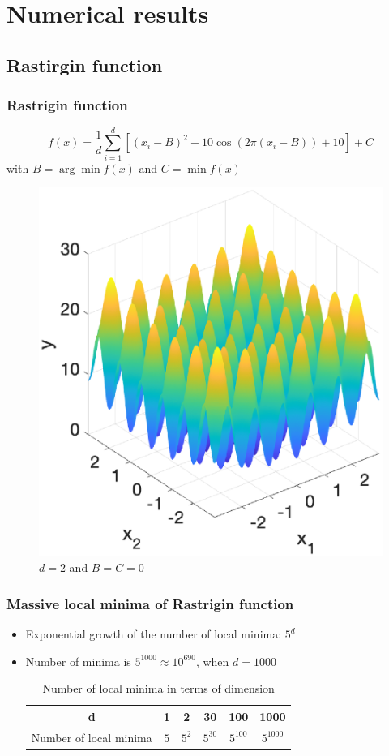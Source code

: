 \documentclass{beamer}
\begin{document}
\section{Numerical results}
\subsection{Rastirgin function}
\begin{frame}
	\frametitle{Rastrigin function}

\begin{equation*}
	f(x) = \frac{1}{d} \sum_{i=1}^d \left[(x_i-B)^2 -10\cos(2\pi (x_i-B)) + 10\right] + C
\end{equation*}
with $B = \arg \min f(x)$ and $C= \min f(x)$ 

\begin{figure}[ht]
	\centering
	\includegraphics[width=0.6\linewidth]{Figure/R_function}
	\caption{$d=2$ and $B=C=0$}
\end{figure}
\end{frame}

\begin{frame}
\frametitle{Massive local minima of Rastrigin function}

\begin{itemize}
	\item Exponential growth of the number of local minima: $5^d$
	\item Number of minima is $5^{1000}\approx 10^{690}$, when $d=1000$
	\begin{table}[ht]
		
		\centering\begin{tabular}{|c|c|c|c|c|c|}
			\hline
			d & 1 & 2 & 30 & 100 & 1000 \\
			\hline
			Number of local minima & $5$ & $5^2$ & $5^{30}$ & $5^{100}$ & $5^{1000}$\\
			\hline 
		\end{tabular}
		\caption{Number of local minima in terms of dimension}
	\end{table}
\end{itemize}

\end{frame}
\end{document}
